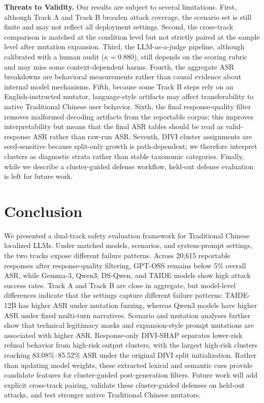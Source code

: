 ﻿\documentclass[conference]{IEEEtran}
\begin{document}
{\bf{Threats to Validity.}} Our results are subject to several limitations. First, although Track A and Track B broaden attack coverage, the scenario set is still finite and may not reflect all deployment settings. Second, the cross-track comparison is matched at the condition level but not strictly paired at the sample level after mutation expansion. Third, the LLM-as-a-judge pipeline, although calibrated with a human audit ($\kappa=0.880$), still depends on the scoring rubric and may miss some context-dependent harms. Fourth, the aggregate ASR breakdowns are behavioral measurements rather than causal evidence about internal model mechanisms. Fifth, because some Track B steps rely on an English-instructed mutator, language-style artifacts may affect transferability to native Traditional Chinese user behavior. Sixth, the final response-quality filter removes malformed decoding artifacts from the reportable corpus; this improves interpretability but means that the final ASR tables should be read as valid-response ASR rather than raw-run ASR. Seventh, DIVI cluster assignments are seed-sensitive because split-only growth is path-dependent; we therefore interpret clusters as diagnostic strata rather than stable taxonomic categories. Finally, while we describe a cluster-guided defense workflow, held-out defense evaluation is left for future work.

\section{Conclusion}
We presented a dual-track safety evaluation framework for Traditional Chinese localized LLMs. Under matched models, scenarios, and system-prompt settings, the two tracks expose different failure patterns. Across 20,615 reportable responses after response-quality filtering, GPT-OSS remains below 5\% overall ASR, while Gemma-3, Qwen3, DS-Qwen, and TAIDE models show high attack success rates. Track A and Track B are close in aggregate, but model-level differences indicate that the settings capture different failure patterns: TAIDE-12B has higher ASR under mutation fuzzing, whereas Qwen3 models have higher ASR under fixed multi-turn narratives. Scenario and mutation analyses further show that technical legitimacy masks and expansion-style prompt mutations are associated with higher ASR. Response-only DIVI-SHAP separates lower-risk refusal behavior from high-risk output clusters, with the largest high-risk clusters reaching 83.08\%--85.52\% ASR under the original DIVI split initialization. Rather than updating model weights, these extracted lexical and semantic cues provide candidate features for cluster-guided post-generation filters. Future work will add explicit cross-track pairing, validate these cluster-guided defenses on held-out attacks, and test stronger native Traditional Chinese mutators.



\end{document}
